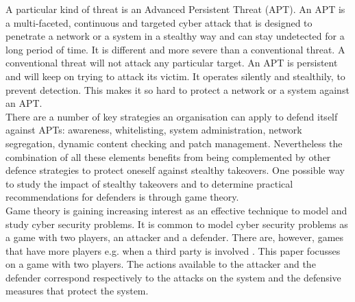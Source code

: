 A particular kind of threat is an Advanced Persistent Threat (APT). An APT is a multi-faceted, continuous and targeted cyber attack that is designed to penetrate a network or a system in a stealthy way and can stay undetected for a long period of time. It is different and more severe than a conventional threat. A conventional threat will not attack any particular target. An APT is persistent and will keep on trying to attack its victim. It operates silently and stealthily, to prevent detection. This makes it so hard to protect a network or a system against an APT. \\
There are a number of key strategies an organisation can apply to defend itself against APTs: awareness, whitelisting, system administration, network segregation, dynamic content checking and patch management. Nevertheless the combination of all these elements benefits from being complemented by other defence strategies to protect oneself against stealthy takeovers. One possible way to study the impact of stealthy takeovers and to determine practical recommendations for defenders is through game theory.\\
Game theory is gaining increasing interest as an effective technique to model and study cyber security problems. It is common to model cyber security problems as a game with two players, an attacker and a defender. There are, however, games that have more players e.g. when a third party is involved \cite{fengstealthy}. This paper focusses on a game with two players. The actions available to the attacker and the defender correspond respectively to the attacks on the system and the defensive measures that protect the system. \\

